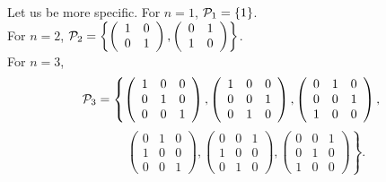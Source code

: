 \documentclass[pra,amsfonts,twocolumn]{revtex4}
\begin{document}
Let us be more specific.
For $n=1$, ${\cal P}_1=\{1\}$.\\
For $n=2$, ${\cal P}_2=\left\{
\left(
\begin{array}{cc}
1&0\\
0&1
\end{array}
\right)
,
\left(
\begin{array}{cc}
0&1\\
1&0
\end{array}
\right)
\right\}$.\\
For $n=3$,
$${\cal P}_3=\left\{
\left(
\begin{array}{ccc}
1&0&0\\
0&1&0\\
0&0&1
\end{array}
\right)
,
\left(
\begin{array}{ccc}
1&0&0\\
0&0&1\\
0&1&0
\end{array}
\right)
,
\left(
\begin{array}{ccc}
0&1&0\\
0&0&1\\
1&0&0
\end{array}
\right)
,\right.$$
$$\qquad \left.
\left(
\begin{array}{ccc}
0&1&0\\
1&0&0\\
0&0&1
\end{array}
\right)
,
\left(
\begin{array}{ccc}
0&0&1\\
1&0&0\\
0&1&0
\end{array}
\right)
,
\left(
\begin{array}{ccc}
0&0&1\\
0&1&0\\
1&0&0
\end{array}
\right)\right\}
.           $$
\end{document}
